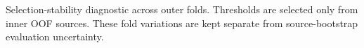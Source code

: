 Selection-stability diagnostic across outer folds. Thresholds are selected only from inner OOF sources. These fold variations are kept separate from source-bootstrap evaluation uncertainty.
